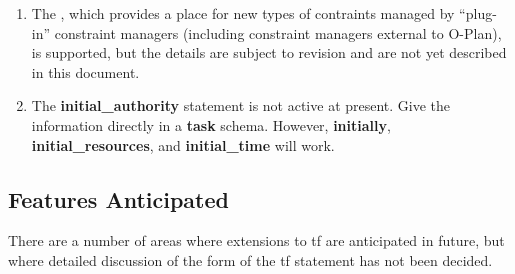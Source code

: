 \begin{enumerate}
\item The , which provides a place for
new types of contraints managed by ``plug-in'' constraint managers
(including constraint managers external to O-Plan), is supported,
but the details are subject to revision and are not yet described
in this document.

\item The {\bf initial\_authority} statement is not active at present.
Give the information directly in a {\bf task} schema.  However,
{\bf initially}, {\bf initial\_resources}, and {\bf initial\_time}
will work.

\end{enumerate}

\subsection{Features Anticipated}

There are a number of areas where extensions to {\sc tf} are anticipated in
future, but where detailed discussion of the form of the {\sc tf} statement
has not been decided. 


